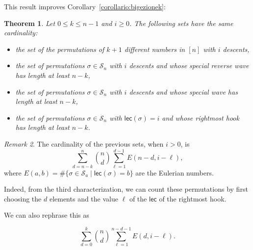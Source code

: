 \documentclass[a4paper]{amsart}
\newcommand{\lec}{\mathsf{lec}}
\newtheorem{theorem}{Theorem}[section]
\theoremstyle{definition}
\theoremstyle{remark}
\newtheorem{remark}[theorem]{Remark}
\numberwithin{equation}{section}
\begin{document}
This result improves Corollary~\ref{corollario:bigezionek}:

\begin{theorem}\label{thm:bigezionek}
Let $0\leq k\leq n-1$ and $i\geq0$. The following sets have the same cardinality:
\begin{itemize}
    \item the set of the permutations of $k+1$ different numbers in $[n]$ with $i$ descents,
    \item the set of permutations $\sigma\in\mathcal{S}_n$ with $i$ descents and whose special reverse wave has length at least $n-k$,
    \item the set of permutations $\sigma\in\mathcal{S}_n$ with $i$ descents and whose special wave has length at least $n-k$,
    \item the set of permutations $\sigma\in\mathcal{S}_n$ with $\lec(\sigma)=i$ and whose rightmost hook has length at least $n-k$.
\end{itemize}
\end{theorem}

\begin{remark}
    The cardinality of the previous sets, when $i>0$, is
    \begin{equation}
        \sum_{d=n-k}^n\binom{n}{d}\sum_{\ell=1}^{d-1}E(n-d,i-\ell),
    \end{equation}
    where $E(a,b)=\#\{\sigma\in\mathcal{S}_a\mid\lec(\sigma)=b\}$ are the Eulerian numbers.

    Indeed, from the third characterization, we can count these permutations by first choosing the $d$ elements and the value $\ell$ of the $\lec$ of the rightmost hook. 

    We can also rephrase this as

    \begin{equation}
        \sum_{d=0}^k\binom{n}{d}\sum_{\ell=1}^{n-d-1}E(d,i-\ell).
    \end{equation}
\end{remark}



\end{document}
